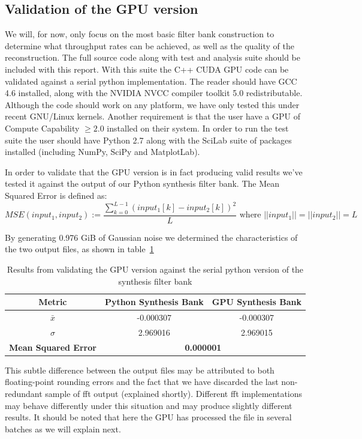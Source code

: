 \documentclass[a4paper,10pt]{article}
\begin{document}
\subsection{Validation of the GPU version}
We will, for now, only focus on the most basic filter bank construction to determine what throughput rates can be achieved, as well as the quality of the reconstruction. The full source code
along with test and analysis suite should be included with this report. With this suite the C++ CUDA GPU code can be validated against a serial python implementation. The reader 
should have GCC 4.6 installed, along with the NVIDIA NVCC compiler toolkit 5.0 redistributable. Although the code should work on any platform, we have only tested this under 
recent GNU/Linux kernels. Another requirement is that the user have a GPU of Compute Capability $\geq2.0$ installed on their system. In order to run the test suite the user should have 
Python 2.7 along with the SciLab suite of packages installed (including NumPy, SciPy and MatplotLab).

In order to validate that the GPU version is in fact producing valid results we've tested it against the output of our Python synthesis filter bank. The Mean Squared Error 
is defined as:
\begin{equation}
 MSE(input_1,input_2) := \frac{\sum_{k=0}^{L-1}{(input_1[k] - input_2[k])^2}}{L} \text{ where } ||input_1|| = ||input_2|| = L
\end{equation}

By generating 0.976 GiB of Gaussian noise we determined the characteristics of the two output files, as shown in table~\ref{validation_gpu}
\begin{table}
  \centering
  \begin{tabular}{|c|c|c|}
    \hline
    \textbf{Metric} & \textbf{Python Synthesis Bank} & \textbf{GPU Synthesis Bank} \\
    \hline
    $\bar x$ & -0.000307 & -0.000307 \\
    \hline
    $\sigma$ & 2.969016 & 2.969015 \\
    \hline
    \textbf{Mean Squared Error} & \multicolumn{2}{|c|}{\textbf{0.000001}} \\
    \hline
  \end{tabular}
  \caption[Validation of the GPU version]{Results from validating the GPU version against the serial python version of the synthesis filter bank}
  \label{validation_gpu}
\end{table}

This subtle difference between the output files may be attributed to both floating-point rounding errors and the fact that we have discarded the last non-redundant
sample of \gls{fft} output (explained shortly). Different \gls{fft} implementations may behave differently under this situation and may produce slightly different results. 
It should be noted that here the GPU has processed the file in several batches as we will explain next.
\end{document}
